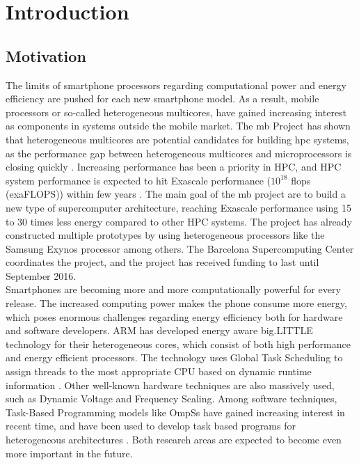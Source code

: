\chapter{Introduction}

\section{Motivation}
\label{sec:mot}
The limits of smartphone processors regarding computational power and energy efficiency are pushed for each new smartphone model. As a result, mobile processors or so-called heterogeneous multicores, have gained increasing interest as components in systems outside the mobile market. The \gls{mb} Project \cite{MB} has shown that heterogeneous multicores are potential candidates for building \gls{hpc} systems, as the performance gap between heterogeneous multicores and microprocessors is closing quickly \cite{a:MB:Raj13}. Increasing performance has been a priority in HPC, and HPC system performance is expected to hit Exascale performance ($10^{18}$ \gls{flops} (exaFLOPS)) within few years \cite{TOP500}. The main goal of the \gls{mb} project are to build a new type of supercomputer architecture, reaching Exascale performance using 15 to 30 times less energy compared to other HPC systems. The project has already constructed multiple prototypes by using heterogeneous processors like the Samsung Exynos \cite{EXY} processor among others. The Barcelona Supercomputing Center coordinates the project, and the project has received funding to last until September 2016. \\

Smartphones are becoming more and more computationally powerful for every release. The increased computing power makes the phone consume more energy, which poses enormous challenges regarding energy efficiency both for hardware and software developers. ARM has developed energy aware big.LITTLE technology for their heterogeneous cores, which consist of both high performance and energy efficient processors. The technology uses Global Task Scheduling to assign threads to the most appropriate CPU based on dynamic runtime information \cite{a:ARM:bL}. Other well-known hardware techniques are also massively used, such as Dynamic Voltage and Frequency Scaling. Among software techniques, Task-Based Programming models like OmpSs \cite{a:ompss2013} have gained increasing interest in recent time, and have been used to develop task based programs for heterogeneous architectures \cite{a:Lien2012}. Both research areas are expected to become even more important in the future. \\

